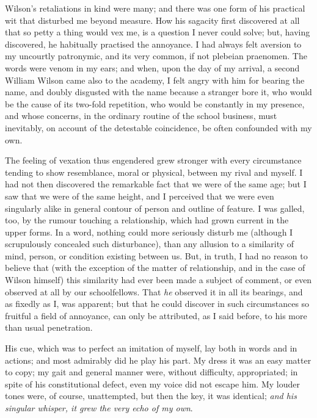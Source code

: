 \documentclass[12pt]{article}
\begin{document}
     Wilson's retaliations in kind were many; and there was one
form of his practical wit that disturbed me beyond measure.  How
his sagacity first discovered at all that so petty a thing would
vex me, is a question I never could solve; but, having discovered,
he habitually practised the annoyance.  I had always felt aversion
to my uncourtly patronymic, and its very common, if not plebeian
praenomen.  The words were venom in my ears; and when, upon the day
of my arrival, a second William Wilson came also to the academy, I
felt angry with him for bearing the name, and doubly disgusted with
the name because a stranger bore it, who would be the cause of its
two-fold repetition, who would be constantly in my presence, and
whose concerns, in the ordinary routine of the  school
business, must inevitably, on account of the detestable
coincidence, be often confounded with my own.

     The feeling of vexation thus engendered grew stronger with
every circumstance tending to show resemblance, moral or physical,
between my rival and myself.  I had not then discovered the
remarkable fact that we were of the same age; but I saw that we
were of the same height, and I perceived that we were even
singularly alike in general contour of person and outline of
feature.  I was galled, too, by the rumour touching a relationship,
which had grown current in the upper forms.  In a word, nothing
could more seriously disturb me (although I scrupulously concealed
such disturbance), than any allusion to a similarity of mind,
person, or condition existing between us.  But, in truth, I had no
reason to believe that (with the exception of the matter of
relationship, and in the case of Wilson himself) this similarity
had ever been made a subject of comment, or even observed at all by
our schoolfellows.  That \emph{he} observed it in all its bearings,
and as fixedly as I, was apparent; but that he could discover in
such circumstances so fruitful a field of annoyance, can only be
attributed, as I said before, to his more than usual penetration.

     His cue, which was to perfect an imitation of myself, lay both
in words and in actions; and most admirably did he play his part. 
My dress it was an easy matter to copy; my gait and general manner
were, without difficulty, appropriated; in spite of his
constitutional defect, even my voice did not escape him.  My louder
tones were, of course, unattempted, but then the key, it was
identical; \emph{and his singular whisper, it grew the very echo of my
own}.
\end{document}
